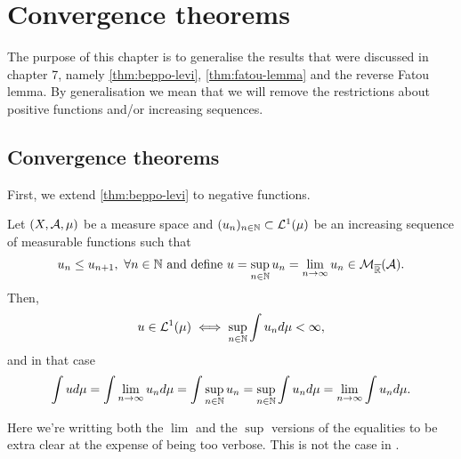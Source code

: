 
\chapter{Convergence theorems}

The purpose of this chapter is to generalise the results that were discussed in chapter 7, namely \autoref{thm:beppo-levi}, \autoref{thm:fatou-lemma} and the reverse Fatou lemma. By generalisation we mean that we will remove the restrictions about positive functions and/or increasing sequences.

\section{Convergence theorems}

First, we extend \autoref{thm:beppo-levi} to negative functions.
\begin{thm}
	\label{thm:monotone-convergence}
	Let $(X, \mathcal{A}, \mu)$ be a measure space and $(u_n)_{n\in\mathbb{N}} \subset \mathcal{L}^1(\mu)$ be an increasing sequence of measurable functions such that
	\begin{align*}
		u_n \leq u_{n+1},\ \forall n \in \mathbb{N}\text{ and define } u = \sup_{n\in \mathbb{N}} u_n = \lim_{n \to \infty} u_n \in \mathcal{M}_{\overline{\mathbb{R}}}(\mathcal{A}).
	\end{align*}
	Then,
	\begin{align}
		\label{eq:monotone-convergence-1}
		u \in \mathcal{L}^1(\mu) \iff \sup_{n\in\mathbb{N}} \int u_n d\mu < \infty,
	\end{align}
	and in that case
	\begin{align}
		\label{eq:monotone-convergence-2}
		\int u d\mu = \int \lim_{n \to \infty} u_n d\mu = \int \sup_{n\in\mathbb{N}} u_n = \sup_{n\in\mathbb{N}} \int u_n d\mu = \lim_{n \to \infty} \int u_n d\mu.
	\end{align}
\end{thm}

Here we're writting both the $\lim$ and the $\sup$ versions of the equalities to be extra clear at the expense of being too verbose. This is not the case in \cite[p- 88]{schilling2017}.

